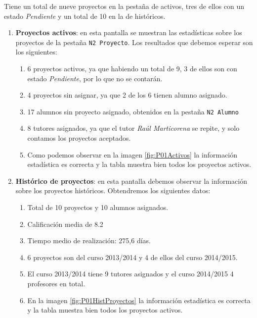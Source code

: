 Tiene un total de nueve proyectos en la pestaña de activos, tres de ellos con un estado \emph{Pendiente} y un total de 10 en la de históricos.

\begin{enumerate}
	\item \textbf{Proyectos activos}: en esta pantalla se muestran las estadísticas sobre los proyectos de la pestaña \texttt{N2 Proyecto}. Los resultados que debemos esperar son los siguientes:
		\begin{enumerate}
			\item 6 proyectos activos, ya que habiendo un total de 9, 3 de ellos son con estado \emph{Pendiente}, por lo que no se contarán.
			\item 4 proyectos sin asignar, ya que 2 de los 6 tienen alumno asignado.
			\item 17 alumnos sin proyecto asignado, obtenidos en la pestaña \texttt{N2 Alumno}
			\item 8 tutores asignados, ya que el tutor \emph{Raúl Marticorena} se repite, y solo contamos los proyectos aceptados.
			
			\item Como podemos observar en la imagen \ref{fig:P01Activos} la información estadística es correcta y la tabla muestra bien todos los proyectos activos.
		\end{enumerate}
	
	\item \textbf{Histórico de proyectos}: en esta pantalla debemos observar la información sobre los proyectos históricos. Obtendremos los siguientes datos:
			\begin{enumerate}
			\item Total de 10 proyectos y 10 alumnos asignados.
			\item Calificación media de 8.2
			\item Tiempo medio de realización: 275,6 días.
			\item 6 proyectos son del curso 2013/2014 y 4 de ellos del curso 2014/2015. 
			\item El curso 2013/2014 tiene 9 tutores asignados y el curso 2014/2015 4 profesores en total.
			
			\item En la imagen \ref{fig:P01HistProyectos} la información estadística es correcta y la tabla muestra bien todos los proyectos activos.
		\end{enumerate}
	

\end{enumerate}
